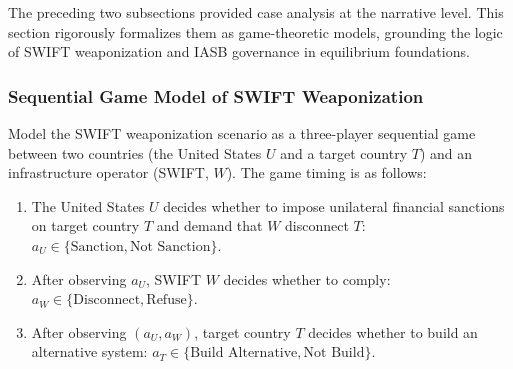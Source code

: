 \documentclass[12pt,a4paper]{ctexart}
\theoremstyle{definition}
\theoremstyle{remark}
\begin{document}
The preceding two subsections provided case analysis at the narrative level. This section rigorously formalizes them as game-theoretic models, grounding the logic of SWIFT weaponization and IASB governance in equilibrium foundations.

\subsubsection{Sequential Game Model of SWIFT Weaponization}

Model the SWIFT weaponization scenario as a three-player sequential game between two countries (the United States $U$ and a target country $T$) and an infrastructure operator (SWIFT, $W$). The game timing is as follows:

\begin{enumerate}[label=Stage \arabic*:, leftmargin=*]
\item The United States $U$ decides whether to impose unilateral financial sanctions on target country $T$ and demand that $W$ disconnect $T$: $a_U \in \{\text{Sanction}, \text{Not Sanction}\}$.
\item After observing $a_U$, SWIFT $W$ decides whether to comply: $a_W \in \{\text{Disconnect}, \text{Refuse}\}$.
\item After observing $(a_U, a_W)$, target country $T$ decides whether to build an alternative system: $a_T \in \{\text{Build Alternative}, \text{Not Build}\}$.
\end{enumerate}
\end{document}
